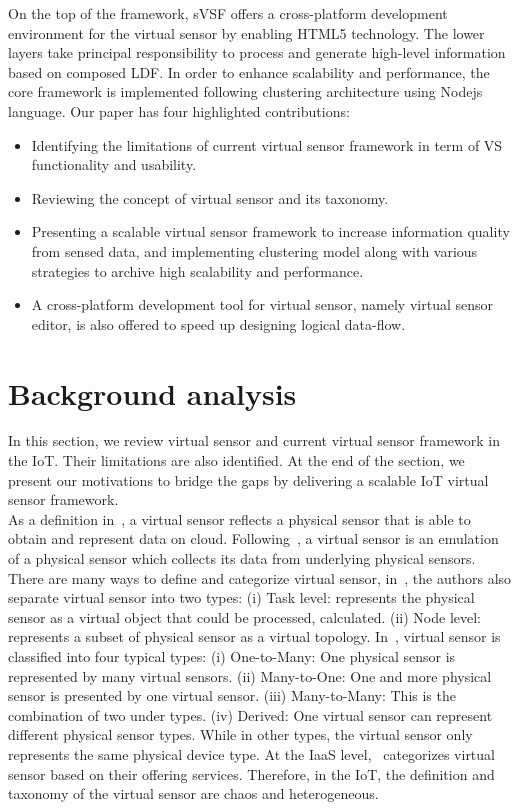 On the top of the framework, sVSF offers a cross-platform development environment for the virtual sensor by enabling HTML5 technology. The lower layers take principal responsibility to process and generate high-level information based on composed LDF. In order to enhance scalability and performance, the core framework is implemented following clustering architecture using Nodejs language. Our paper has four highlighted contributions:
\begin{itemize}
    \item Identifying the limitations of current virtual sensor framework in term of VS functionality and usability.
    \item Reviewing the concept of virtual sensor and its taxonomy.
    \item Presenting a scalable virtual sensor framework to increase information quality from sensed data, and implementing clustering model along with various strategies to archive high scalability and performance. 
    \item A cross-platform development tool for virtual sensor, namely virtual sensor editor, is also offered to speed up designing logical data-flow.
\end{itemize}


\section{Background analysis}

In this section, we review virtual sensor and current virtual sensor framework in the IoT. Their limitations are also identified. At the end of the section, we present our motivations to bridge the gaps by delivering a scalable IoT virtual sensor framework.\\

As a definition in~\cite{GuptaMukherjee2016}, a virtual sensor reflects a physical sensor that is able to obtain and represent data on cloud. Following~\cite{MadriaKumarDalvi2014}, a virtual sensor is an emulation of a physical sensor which collects its data from underlying physical sensors. There are many ways to define and categorize virtual sensor, in~\cite{GuptaMukherjee2016}, the authors also separate virtual sensor into two types: (i) Task level: represents the physical sensor as a virtual object that could be processed, calculated. (ii) Node level: represents a subset of physical sensor as a virtual topology.  In~\cite{MadriaKumarDalvi2014}, virtual sensor is classified into four typical types: (i) One-to-Many: One physical sensor is represented by many virtual sensors. (ii) Many-to-One: One and more physical sensor is presented by one virtual sensor. (iii) Many-to-Many: This is the combination of two under types. (iv) Derived: One virtual sensor can represent different physical sensor types. While in other types, the virtual sensor only represents the same physical device type. At the IaaS level,~\cite{BoseGuptaAdhikaryMukherjee2015} categorizes virtual sensor based on their offering services. Therefore, in the IoT, the definition and taxonomy of the virtual sensor are chaos and heterogeneous. \\

